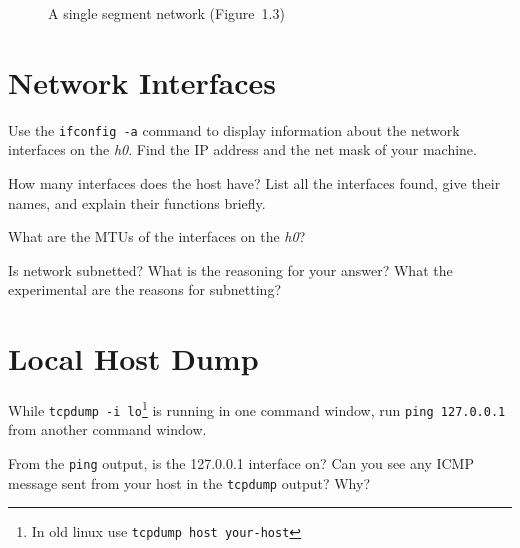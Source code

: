 \documentclass{../UTNetLab}
\begin{document}
\begin{center}
\begin{minipage}{0.48\textwidth}
\begin{flushright}
\begin{figure}[H]
                    \caption{A single segment network (Figure~1.3)}\label{fig:1.3}
                \end{figure}
            \end{flushright}
        \end{minipage}
    \end{center}

\section{Network Interfaces}
    Use the \lstinline{ifconfig -a} command to display information about the network interfaces on the \textit{h0}.
    Find the IP address and the net mask of your machine.
    
    \begin{report}
        \item How many interfaces does the host have?
            List all the interfaces found, give their names, and explain their functions briefly.

        \item What are the MTUs of the interfaces on the \textit{h0}?

        \item Is network subnetted?
            What is the reasoning for your answer? What the experimental are the reasons for subnetting?
    \end{report}


\section{Local Host Dump}
    While \lstinline[emph={lo}]{tcpdump -i lo}\footnote{In old linux use \lstinline[emph={your-host}]{tcpdump host your-host}} is running in one command window, run \lstinline{ping 127.0.0.1} from another command window.

    \begin{report}
        \item From the \lstinline{ping} output, is the 127.0.0.1 interface on?
            Can you see any ICMP message sent from your host in the \lstinline{tcpdump} output?
            Why?
    \end{report}
\end{document}
